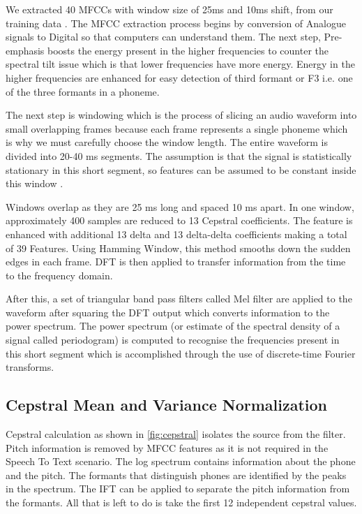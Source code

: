 We extracted 40 MFCCs with  window size of 25ms and 10ms shift, from our training data \cite{naeem_subspace_2020}. The MFCC extraction process begins by conversion of Analogue signals to Digital so that computers can understand them. The next step, Pre-emphasis boosts the energy present in the higher frequencies to counter the spectral tilt issue which is that lower frequencies have more energy. Energy in the higher frequencies are enhanced for easy detection of third formant or F3 i.e. one of the three formants in a phoneme. 

The next step is windowing which is the process of slicing an audio waveform into small overlapping frames because each frame represents a single phoneme which is why we must carefully choose the window length. The entire waveform is divided into 20-40 ms segments. The assumption is that the signal is statistically stationary in this short segment, so features can be assumed to be constant inside this window \cite{raj_note_nodate}. 

Windows overlap as they are 25 ms long and spaced 10 ms apart. In one window, approximately 400 samples are reduced to 13 Cepstral coefficients. The feature is enhanced with additional 13 delta and 13 delta-delta coefficients making a total of 39 Features. Using Hamming Window, this method smooths down the sudden edges in each frame. DFT is then applied to transfer information from the time to the frequency domain. 

After this, a set of triangular band pass filters called Mel filter are applied to the waveform after squaring the DFT output which converts information to the power spectrum. The power spectrum (or estimate of the spectral density of a signal called periodogram) is computed to recognise the frequencies present in this short segment which is accomplished through the use of discrete-time Fourier transforms.  

\subsection{Cepstral Mean and Variance Normalization}
\label{sub:CMVN}
Cepstral calculation as shown in \ref{fig:cepstral} isolates the source from the filter. Pitch information is removed by MFCC features as it is not required in the Speech To Text scenario. The log spectrum contains information about the phone and the pitch. The formants that distinguish phones are identified by the peaks in the spectrum. The IFT can be applied to separate the pitch information from the formants. All that is left to do is take the first 12 independent cepstral values.

